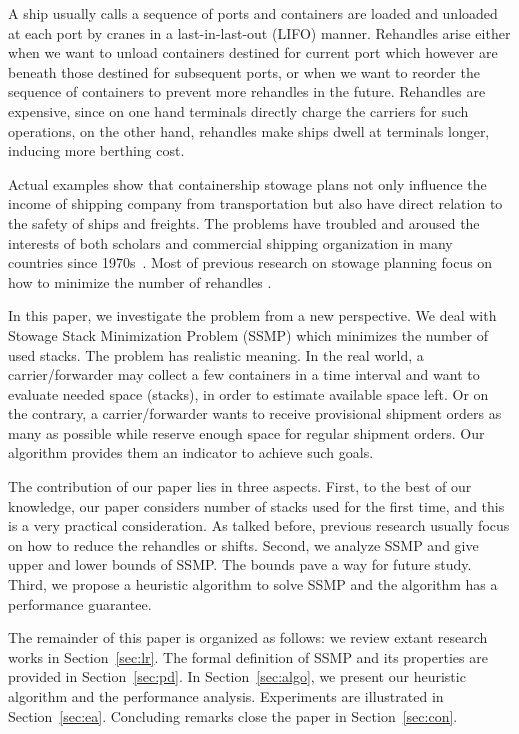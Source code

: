 \documentclass[review,3p,times,authoryear,12pt]{elsarticle}
\begin{document}
A ship usually calls a sequence of ports and containers are loaded and unloaded at each port by cranes in a last-in-last-out (LIFO) manner.
Rehandles arise either when we want to unload containers destined for current port which however are beneath those destined for subsequent ports, or when we want to reorder the sequence of containers to prevent more rehandles in the future.
Rehandles are expensive, since on one hand terminals directly charge the carriers for such operations, on the other hand, rehandles make ships dwell at terminals longer, inducing more berthing cost.

Actual examples show that containership stowage plans not only influence the income of shipping company from transportation but also have direct relation to the safety of ships and freights.
The problems have troubled and aroused the interests of both scholars and commercial shipping organization in many countries since 1970s~\citep{webster1970container}.
Most of previous research on stowage planning focus on how to minimize the number of rehandles \citep{ding2015stowage,zhang2016multiobjective,zehendner2017algorithm}.

In this paper, we investigate the problem from a new perspective. We deal with Stowage Stack Minimization Problem (SSMP) which minimizes the number of used stacks.
The problem has realistic meaning. In the real world, a carrier/forwarder may collect a few containers in a time interval and want to evaluate needed space (stacks), in order to estimate available space left.
Or on the contrary, a carrier/forwarder wants to receive provisional shipment orders as many as possible while reserve enough space for regular shipment orders.
Our algorithm provides them an indicator to achieve such goals.

The contribution of our paper lies in three aspects.
First, to the best of our knowledge, our paper considers number of stacks used for the first time, and this is a very practical consideration.
As talked before, previous research usually focus on how to reduce the rehandles or shifts.
Second, we analyze SSMP and give upper and lower bounds of SSMP. The bounds pave a way for future study.
Third, we propose a heuristic algorithm to solve SSMP and the algorithm has a performance guarantee.

The remainder of this paper is organized as follows: we review extant research works in Section~\ref{sec:lr}. The formal definition of SSMP and its properties are provided in Section~\ref{sec:pd}.
In Section~\ref{sec:algo}, we present our heuristic algorithm and the performance analysis.
Experiments are illustrated in Section~\ref{sec:ea}. Concluding remarks close the paper in Section~\ref{sec:con}.
\end{document}
